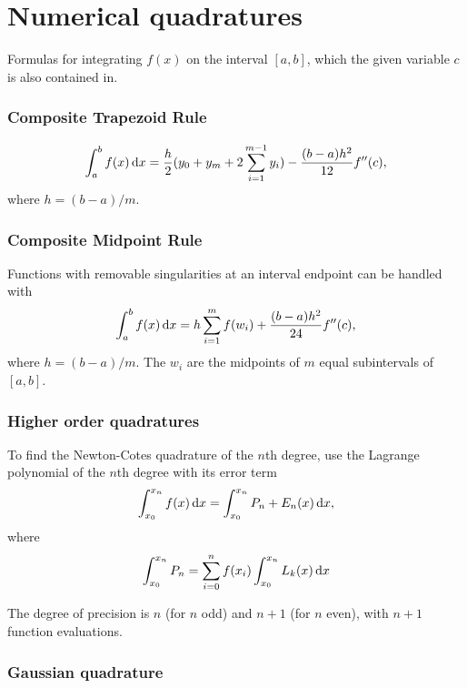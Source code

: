 \section{Numerical quadratures}
Formulas for integrating $f(x)$ on the interval $[a,b]$, which the given variable $c$ is also contained in.

\subsubsection{Composite Trapezoid Rule}
$$
\int_{a}^{b} f(x) \mathop{}\!\mathrm{d}{x} = \frac{h}{2}(y_0+y_m + 2\sum_{i=1}^{m-1}y_i) - \frac{(b-a)h^2}{12}f''(c),
$$
where $h = (b-a)/m$.

\subsubsection{Composite Midpoint Rule}
Functions with removable singularities at an interval endpoint can be handled with
$$
\int_{a}^{b} f(x) \mathop{}\!\mathrm{d}{x} = h \sum_{i=1}^mf(w_i) + \frac{(b-a)h^2}{24}f''(c),
$$
where $h = (b - a)/m$. The $w_i$ are the midpoints of $m$ equal subintervals of $[a,b]$.

\subsubsection{Higher order quadratures}


To find the Newton-Cotes quadrature of the $n$th degree, use the Lagrange polynomial of the $n$th degree with its error term
$$
\int_{x_0}^{x_n} f(x) \mathop{}\!\mathrm{d}{x} = \int_{x_0}^{x_n} P_{n} + E_n(x) \mathop{}\!\mathrm{d}{x}, 
$$
where
$$
\int_{x_0}^{x_n} P_{n} = \sum_{i=0}^n f(x_i) \int_{x_0}^{x_n} L_k(x) \mathop{}\!\mathrm{d}{x}
$$

The degree of precision is $n$ (for $n$ odd) and $n+1$ (for $n$ even), with $n+1$ function evaluations.

\subsubsection{Gaussian quadrature}

